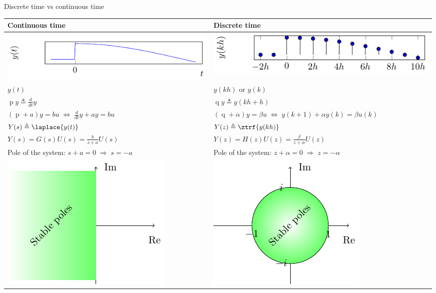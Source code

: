 \documentclass[presentation,aspectratio=169]{beamer}
\begin{document}
\begin{frame}[label=sec-5-5]{Discrete time vs continuous time}
\begin{center}
\begin{tabular}{ll}
Continuous time & Discrete time\\
\hline
\includegraphics[width=0.4\linewidth]{../../figures/cont-fcn} & \includegraphics[width=0.4\linewidth]{../../figures/discrete-fcn}\\
\(y(t)\) & \(y(kh)\) or \(y(k)\)\\
\(\operatorname{p} y \triangleq \frac{d}{dt} y\) & \(\operatorname{q}y \triangleq y(kh+h)\)\\
\( (\operatorname{p}+a) y = bu \;\Leftrightarrow\; \frac{d}{dt}y + ay = bu\) & \( (\operatorname{q} + \alpha) y = \beta u \; \Leftrightarrow \; y(k+1) + \alpha y(k) = \beta u(k)\)\\
\(Y(s) \triangleq \laplace{y(t)}\) & \(Y(z) \triangleq \ztrf{y(kh)}\)\\
\( Y(s) = G(s)U(s) = \frac{b}{s+a}U(s)\) & \(Y(z) = H(z)U(z) = \frac{\beta}{z+\alpha}U(z)\)\\
Pole of the system: \(s+a=0 \; \Rightarrow \; s = -a\) & Pole of the system: \( z+\alpha = 0 \; \Rightarrow \; z = -\alpha \)\\
\includegraphics[width=0.22\linewidth]{../../figures/cont-stable} & \includegraphics[width=0.22\linewidth]{../../figures/discrete-stable}\\
\hline
\end{tabular}
\end{center}
\end{frame}
\end{document}
